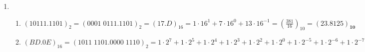 \documentclass{article}
\newenvironment{arabenum}{
    \begin{enumerate}[label=\textbf{\arabic*})]
}{
    \end{enumerate}
}
\newenvironment{alphenum}{
    \begin{enumerate}[label=(\alph*)]
}{
    \end{enumerate}
}
\begin{document}
\begin{arabenum}
\begin{alphenum}
\item $(4321)_{F!} = 4 \cdot 4! + 3 \cdot 3! + 2 \cdot 2! + 1 \cdot 1! =
\boldsymbol{(119)_{10}}$

\item $(10000)_{F!} = 1 \cdot 5! = \boldsymbol{(120)_{10}}$

\item $(0.02)_{F!} = \frac{0}{2!} + \frac{2}{3!} = (\frac{2}{6})_{10} =
(\frac{1}{3})_{10} = \boldsymbol{(0.333333 \dots)_{10}}$

\item $(0.113)_{F!} = \frac{1}{2!} + \frac{1}{3!} + \frac{3}{4!} =
(\frac{19}{24})_{10} = \boldsymbol{(0.791\overline{6} \dots)_{10}}$

\item $(321.123)_{F!} = 3 \cdot 3! + 2 \cdot 2! + 1 \cdot 1! + \frac{1}{2!} +
\frac{2}{3!} + \frac{3}{4!} = (\frac{575}{24})_{10} =
\boldsymbol{(23.958\overline{3})_{10}}$

\end{alphenum}

\item \begin{alphenum}

\item $(10111.1101)_2 = (0001 \; 0111.1101)_2 = (17.D)_{16} = 1 \cdot 16^1 +
7 \cdot 16^0 + 13 \cdot 16^{-1} = (\frac{381}{16})_{10} =
\boldsymbol{(23.8125)_{10}}$

\item $(BD.0E)_{16} = (1011 \; 1101.0000 \; 1110)_2 = 1 \cdot 2^7 +
1 \cdot 2^5 + 1 \cdot 2^4 + 1 \cdot 2^3 + 1 \cdot 2^2 + 1 \cdot 2^0 +
1 \cdot 2^{-5} + 1 \cdot 2^{-6} + 1 \cdot 2^{-7} = (\frac{24199}{128})_{10} =
\boldsymbol{(189.0546875)_{10}}$


\end{alphenum}
\end{arabenum}
\end{document}
